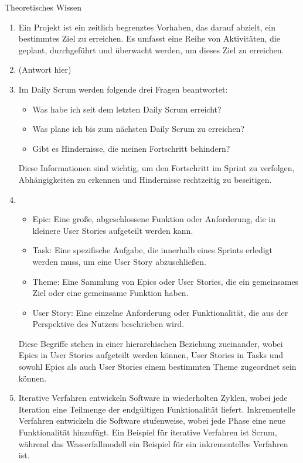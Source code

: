 \documentclass{article}
\begin{document}
\begin{exercise}{Theoretisches Wissen}
  \begin{solution}
    \begin{enumerate}
      \item Ein Projekt ist ein zeitlich begrenztes Vorhaben, das darauf abzielt, ein bestimmtes Ziel zu erreichen. Es umfasst eine Reihe von Aktivitäten, die geplant, durchgeführt und überwacht werden, um dieses Ziel zu erreichen.
      \item (Antwort hier)
      \item Im Daily Scrum werden folgende drei Fragen beantwortet:
            \begin{itemize}
              \item Was habe ich seit dem letzten Daily Scrum erreicht?
              \item Was plane ich bis zum nächsten Daily Scrum zu erreichen?
              \item Gibt es Hindernisse, die meinen Fortschritt behindern?
            \end{itemize}
            Diese Informationen sind wichtig, um den Fortschritt im Sprint zu verfolgen, Abhängigkeiten zu erkennen und Hindernisse rechtzeitig zu beseitigen.
      \item
            \begin{itemize}
              \item Epic: Eine große, abgeschlossene Funktion oder Anforderung, die in kleinere User Stories aufgeteilt werden kann.
              \item Task: Eine spezifische Aufgabe, die innerhalb eines Sprints erledigt werden muss, um eine User Story abzuschließen.
              \item Theme: Eine Sammlung von Epics oder User Stories, die ein gemeinsames Ziel oder eine gemeinsame Funktion haben.
              \item User Story: Eine einzelne Anforderung oder Funktionalität, die aus der Perspektive des Nutzers beschrieben wird.
            \end{itemize}
            Diese Begriffe stehen in einer hierarchischen Beziehung zueinander, wobei Epics in User Stories aufgeteilt werden können, User Stories in Tasks und sowohl Epics als auch User Stories einem bestimmten Theme zugeordnet sein können.
      \item Iterative Verfahren entwickeln Software in wiederholten Zyklen, wobei jede Iteration eine Teilmenge der endgültigen Funktionalität liefert. Inkrementelle Verfahren entwickeln die Software stufenweise, wobei jede Phase eine neue Funktionalität hinzufügt. Ein Beispiel für iterative Verfahren ist Scrum, während das Wasserfallmodell ein Beispiel für ein inkrementelles Verfahren ist.

\end{enumerate}
\end{solution}
\end{exercise}
\end{document}
